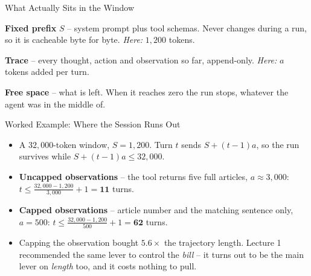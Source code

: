 \begin{frame}{What Actually Sits in the Window}
\begin{rldefinition}
\textbf{Fixed prefix} $S$ -- system prompt plus tool schemas. Never changes during a run, so it is cacheable byte for byte. \emph{Here:} $1{,}200$ tokens.

\smallskip
\textbf{Trace} -- every thought, action and observation so far, append-only. \emph{Here:} $a$ tokens added per turn.

\smallskip
\textbf{Free space} -- what is left. When it reaches zero the run stops, whatever the agent was in the middle of.
\end{rldefinition}
\pause
\centering
{}
\end{frame}

\begin{frame}{Worked Example: Where the Session Runs Out}
\small
\begin{itemize}
  \item A $32{,}000$-token window, $S = 1{,}200$. Turn $t$ sends $S + (t-1)a$, so the run survives while $S + (t-1)a \le 32{,}000$.
  \pause
  \item \textbf{Uncapped observations} -- the tool returns five full articles, $a \approx 3{,}000$:
  $t \le \tfrac{32{,}000 - 1{,}200}{3{,}000} + 1 = \mathbf{11}$ turns.
  \pause
  \item \textbf{Capped observations} -- article number and the matching sentence only, $a = 500$:
  $t \le \tfrac{32{,}000 - 1{,}200}{500} + 1 = \mathbf{62}$ turns.
  \pause
  \item Capping the observation bought $5.6\times$ the trajectory length. Lecture 1 recommended the same lever to control the \emph{bill} -- it turns out to be the main lever on \emph{length} too, and it costs nothing to pull.
\end{itemize}
\end{frame}

